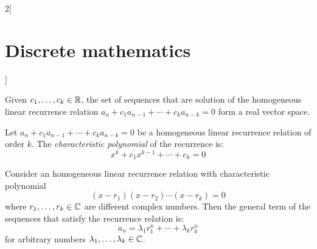 \documentclass[../../../main.tex]{subfiles}
\begin{document}
\begin{multicols}{2}[\section{Discrete mathematics}]
\begin{prop}
    \end{prop}
    \begin{prop}
        Given $c_1,\ldots,c_k\in\mathbb{R} $, the set of sequences that are solution of the homogeneous linear recurrence relation $a_n+c_1a_{n-1}+\cdots+c_ka_{n-k}=0$ form a real vector space.
    \end{prop}
    \begin{definition}
        Let $a_n+c_1a_{n-1}+\cdots+c_ka_{n-k}=0$ be a homogeneous linear recurrence relation of order $k$. The \textit{characteristic polynomial} of the recurrence is: $$x^k+c_1x^{k-1}+\cdots+c_k=0$$
    \end{definition}
    \begin{prop}
        Consider an homogeneous linear recurrence relation with characteristic polynomial $$(x-r_1)(x-r_2)\cdots(x-r_k)=0$$ where $r_1,\ldots,r_k\in\mathbb{C} $ are different complex numbers. Then the general term of the sequences that satisfy the recurrence relation is: $$a_n=\lambda_1r_1^n+\cdots+\lambda_kr_k^n$$ for arbitrary numbers $\lambda_1,\ldots,\lambda_k\in\mathbb{C} $.
    \end{prop}

\end{multicols}
\end{document}
